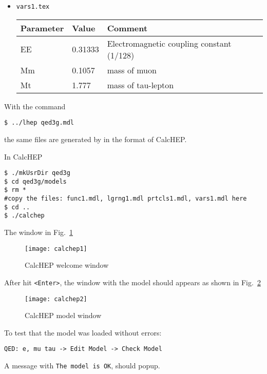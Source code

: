 \begin{frame}{}
\begin{itemize}
\item \lstinline{vars1.tex}
  \begin{center}
    \begin{tabular}{|l|l|l|} \hline
Parameter & Value & Comment \\ \hline
EE    &0.31333             &Electromagnetic coupling constant (1/128) \\
Mm    &0.1057              &mass of muon \\
Mt    &1.777               &mass of tau-lepton \\ \hline
\end{tabular}
  \end{center}
\end{itemize}

With the command
\begin{lstlisting}
$ ../lhep qed3g.mdl
\end{lstlisting}
the same files are generated by in the format of CalcHEP.

In CalcHEP
\begin{lstlisting}
$ ./mkUsrDir qed3g
$ cd qed3g/models
$ rm *
#copy the files: func1.mdl, lgrng1.mdl prtcls1.mdl, vars1.mdl here
$ cd ..
$ ./calchep
\end{lstlisting}
The window in Fig.~\ref{fig:calchep1}
\begin{figure}
  \centering
  \texttt{[image: calchep1]}
  \caption{CalcHEP welcome window}
  \label{fig:calchep1}
\end{figure}
After hit \lstinline{<Enter>}, the window with the model should appears as shown in Fig.~\ref{fig:calchep2}
\begin{figure}
  \centering
  \texttt{[image: calchep2]}
  \caption{CalcHEP model window}
  \label{fig:calchep2}
\end{figure}
To test that the model was loaded without errors:
\begin{lstlisting}
QED: e, mu tau -> Edit Model -> Check Model
\end{lstlisting}
A message with \lstinline{The model is OK}, should popup.


\end{frame}
